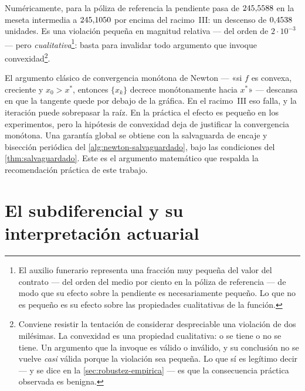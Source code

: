 Numéricamente, para la póliza de referencia la pendiente pasa de
$245{,}5588$ en la meseta intermedia a $245{,}1050$ por encima del
racimo~III: un descenso de $0{,}4538$ unidades. Es una violación pequeña en
magnitud relativa --- del orden de $2\cdot10^{-3}$ --- pero \emph{cualitativa}\footnote{El auxilio funerario representa una fracción muy pequeña del valor del contrato --- del orden del medio por ciento en la póliza de referencia --- de modo que su efecto sobre la pendiente es necesariamente pequeño. Lo que no es pequeño es su efecto sobre las propiedades cualitativas de la función.}: basta
para invalidar todo argumento que invoque convexidad\footnote{Conviene resistir la tentación de considerar despreciable una violación de dos milésimas. La convexidad es una propiedad cualitativa: o se tiene o no se tiene. Un argumento que la invoque es válido o inválido, y su conclusión no se vuelve \emph{casi} válida porque la violación sea pequeña. Lo que sí es legítimo decir --- y se dice en la \cref{sec:robustez-empirica} --- es que la consecuencia práctica observada es benigna.}.

\begin{criticism}
\label{crit:convexidad}
El argumento clásico de convergencia monótona de Newton --- «si $f$ es convexa,
creciente y $x_0>x^*$, entonces $\{x_k\}$ decrece monótonamente hacia $x^*$» ---
descansa en que la tangente quede por debajo de la gráfica. En el racimo~III eso
falla, y la iteración puede sobrepasar la raíz. En la práctica el efecto es
pequeño en los experimentos, pero la hipótesis de convexidad deja de justificar
la convergencia monótona. Una garantía global se obtiene con la salvaguarda de
encaje y bisección periódica del \cref{alg:newton-salvaguardado}, bajo las
condiciones del \cref{thm:salvaguardado}. Este es
el argumento matemático que respalda la recomendación práctica de este trabajo.
\end{criticism}

\section{El subdiferencial y su interpretación actuarial}

